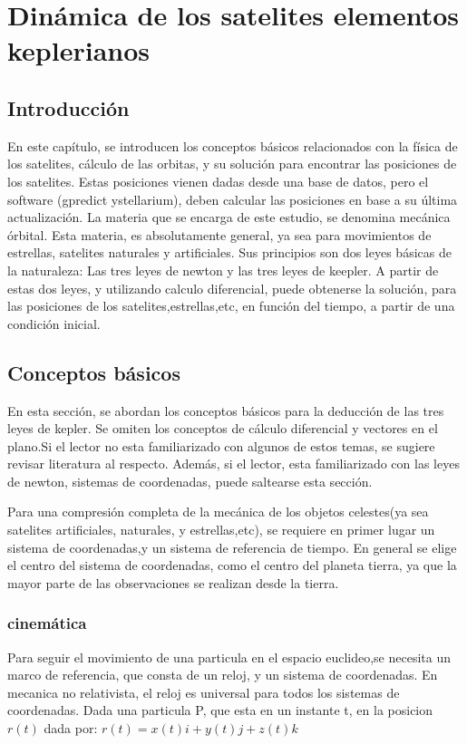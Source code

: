 \renewcommand{\chaptername}{Dinámica de los satelites  elementos keplerianos}
\chapter{Dinámica de los satelites  elementos keplerianos}
\section{Introducción} 
En este capítulo, se introducen los conceptos básicos relacionados con la física de los satelites, cálculo de las orbitas, y su solución para encontrar las posiciones de los satelites. Estas posiciones vienen dadas desde una base de datos, pero el software (gpredict ystellarium), deben calcular las posiciones en base a su última actualización. La materia que se encarga de este estudio, se denomina mecánica órbital. Esta materia, es absolutamente general, ya sea para movimientos de estrellas, satelites naturales y artificiales. Sus principios son dos leyes básicas de la naturaleza: Las tres leyes de newton y las tres leyes de keepler. A partir de estas dos leyes, y utilizando calculo diferencial, puede obtenerse la solución, para las posiciones de los satelites,estrellas,etc, en función del tiempo, a partir de una condición inicial. 


\section{Conceptos básicos}

En esta sección, se abordan los conceptos básicos para la deducción de las tres leyes de kepler. Se omiten los conceptos de cálculo diferencial y vectores en el plano.Si el lector no esta familiarizado con algunos de estos temas, se sugiere revisar literatura al respecto. Además, si el lector, esta familiarizado con las leyes de newton, sistemas de coordenadas, puede saltearse esta sección. 


Para una compresión completa de la mecánica de los objetos celestes(ya sea satelites artificiales, naturales, y estrellas,etc), se requiere en primer lugar un sistema de coordenadas,y un sistema de referencia de tiempo. En general se elige el centro del sistema de coordenadas, como el centro del planeta tierra, ya que la mayor parte de las observaciones se realizan desde la tierra.

\subsection{cinemática}
	Para seguir el movimiento de una particula en el espacio euclideo,se necesita un marco de referencia, que consta de un reloj, y un sistema de coordenadas. En mecanica no relativista, el reloj es universal para todos los sistemas de coordenadas. Dada una particula P, que esta en un instante t, en la posicion $r(t)$ dada por: 
	$r(t)=x(t)i + y(t)j +z(t) k $ 
	 


